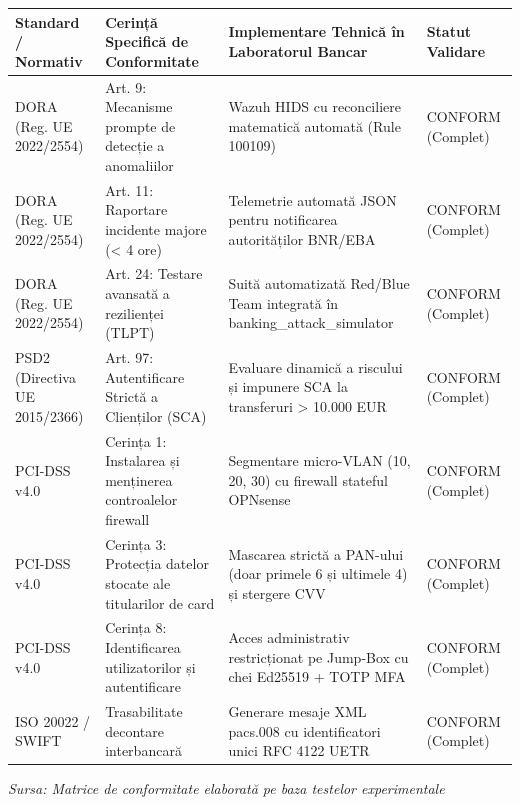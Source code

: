 \begin{table}[htbp]
\centering
\small
\begin{tabular}{p{} p{} p{} p{}}
\toprule
Standard / Normativ & Cerință Specifică de Conformitate & Implementare Tehnică în Laboratorul Bancar & Statut Validare \\
\midrule
DORA (Reg. UE 2022/2554) & Art. 9: Mecanisme prompte de detecție a anomaliilor & Wazuh HIDS cu reconciliere matematică automată (Rule 100109) & CONFORM (Complet) \\
DORA (Reg. UE 2022/2554) & Art. 11: Raportare incidente majore (< 4 ore) & Telemetrie automată JSON pentru notificarea autorităților BNR/EBA & CONFORM (Complet) \\
DORA (Reg. UE 2022/2554) & Art. 24: Testare avansată a rezilienței (TLPT) & Suită automatizată Red/Blue Team integrată în banking\_attack\_simulator & CONFORM (Complet) \\
PSD2 (Directiva UE 2015/2366) & Art. 97: Autentificare Strictă a Clienților (SCA) & Evaluare dinamică a riscului și impunere SCA la transferuri > 10.000 EUR & CONFORM (Complet) \\
PCI-DSS v4.0 & Cerința 1: Instalarea și menținerea controalelor firewall & Segmentare micro-VLAN (10, 20, 30) cu firewall stateful OPNsense & CONFORM (Complet) \\
PCI-DSS v4.0 & Cerința 3: Protecția datelor stocate ale titularilor de card & Mascarea strictă a PAN-ului (doar primele 6 și ultimele 4) și stergere CVV & CONFORM (Complet) \\
PCI-DSS v4.0 & Cerința 8: Identificarea utilizatorilor și autentificare & Acces administrativ restricționat pe Jump-Box cu chei Ed25519 + TOTP MFA & CONFORM (Complet) \\
ISO 20022 / SWIFT & Trasabilitate decontare interbancară & Generare mesaje XML pacs.008 cu identificatori unici RFC 4122 UETR & CONFORM (Complet) \\
\bottomrule
\end{tabular}
\end{table}

\textit{Sursa: Matrice de conformitate elaborată pe baza testelor experimentale}


